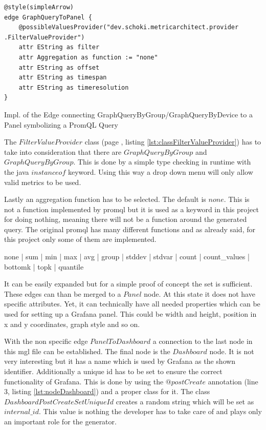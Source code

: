 \begin{listing}[H]
	\begin{verbatim}
@style(simpleArrow)
edge GraphQueryToPanel {
	@possibleValuesProvider("dev.schoki.metricarchitect.provider .FilterValueProvider")
	attr EString as filter
	attr Aggregation as function := "none"
	attr EString as offset
	attr EString as timespan
	attr EString as timeresolution
}
	\end{verbatim}
	\caption{Impl. of the Edge connecting GraphQueryByGroup/GraphQueryByDevice to a Panel symbolizing a PromQL Query}
	\label{lst:GraphQueryToPanel}
\end{listing}

The $FilterValueProvider$ class (page \pageref{lst:classFilterValueProvider}, listing \ref{lst:classFilterValueProvider}) has to take into consideration that there are $GraphQueryByGroup$ and $GraphQueryByGroup$. This is done by a simple type checking in runtime with the java $instanceof$ keyword. Using this way a drop down menu will only allow valid metrics to be used.

Lastly an aggregation function has to be selected. The default is $none$. This is not a function implemented by \gls{promql} but it is used as a keyword in this project for doing nothing, meaning there will not be a function around the generated query. The original \gls{promql} has many different functions and as already said, for this project only some of them are implemented. 

\begin{center}
	none | sum | min | max | avg | group | stddev | stdvar | count | count\_values | bottomk | topk  | quantile
\end{center}

It can be easily expanded but for a simple proof of concept the set is sufficient. These edges can than be merged to a $Panel$ node. At this state it does not have specific attributes. Yet, it can technically have all needed properties which can be used for setting up a Grafana panel. This could be width and height, position in x and y coordinates, graph style and so on.

With the non specific edge $PanelToDashboard$ a connection to the last node in this \gls{mgl} file can be established. The final node is the $Dashboard$ node. It is not very interesting but it has a name which is used by Grafana as the shown identifier. Additionally a unique id has to be set to ensure the correct functionality of Grafana. This is done by using the $@postCreate$ annotation (line 3, listing \ref{lst:nodeDashboard}) and a proper class for it. The class $DashboardPostCreateSetUniqueId$ creates a random string which will be set as $internal\_id$. This value is nothing the developer has to take care of and plays only an important role for the generator.

